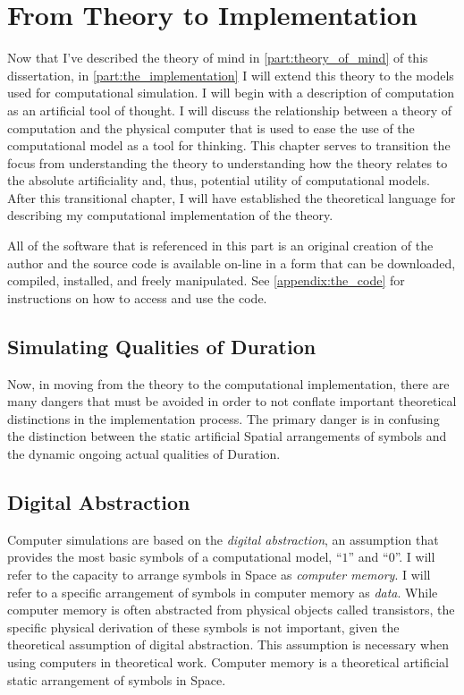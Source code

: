\chapter{From Theory to Implementation}
\label{chapter:from_theory_to_implementation}

Now that I've described the theory of mind in
\autoref{part:theory_of_mind} of this dissertation, in
\autoref{part:the_implementation} I will extend this theory to the
models used for computational simulation.  I will begin with a
description of computation as an artificial tool of thought.  I will
discuss the relationship between a theory of computation and the
physical computer that is used to ease the use of the computational
model as a tool for thinking.  This chapter serves to transition the
focus from understanding the theory to understanding how the theory
relates to the absolute artificiality and, thus, potential utility of
computational models.  After this transitional chapter, I will have
established the theoretical language for describing my computational
implementation of the theory.

All of the software that is referenced in this part is an original
creation of the author and the source code is available on-line in a
form that can be downloaded, compiled, installed, and freely
manipulated.  See \autoref{appendix:the_code} for instructions on how
to access and use the code.

\section{Simulating Qualities of Duration}

Now, in moving from the theory to the computational implementation,
there are many dangers that must be avoided in order to not conflate
important theoretical distinctions in the implementation process.  The
primary danger is in confusing the distinction between the static
artificial Spatial arrangements of symbols and the dynamic ongoing
actual qualities of Duration.

\section{Digital Abstraction}

Computer simulations are based on the \emph{digital abstraction}, an
assumption that provides the most basic symbols of a computational
model, ``$1$'' and ``$0$''.  I will refer to the capacity to arrange
symbols in Space as \emph{computer memory}.  I will refer to a
specific arrangement of symbols in computer memory as \emph{data}.
While computer memory is often abstracted from physical objects called
transistors, the specific physical derivation of these symbols is not
important, given the theoretical assumption of digital abstraction.
This assumption is necessary when using computers in theoretical work.
Computer memory is a theoretical artificial static arrangement of
symbols in Space.

